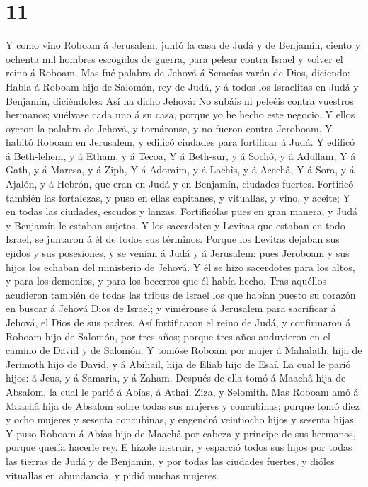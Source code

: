 \hypertarget{section-10}{%
\section{11}\label{section-10}}

 Y como vino Roboam á Jerusalem, juntó la casa de Judá y de
Benjamín, ciento y ochenta mil hombres escogidos de guerra, para pelear
contra Israel y volver el reino á Roboam.  Mas fué palabra
de Jehová á Semeías varón de Dios, diciendo:  Habla á Roboam
hijo de Salomón, rey de Judá, y á todos los Israelitas en Judá y
Benjamín, diciéndoles:  Así ha dicho Jehová: No subáis ni
peleéis contra vuestros hermanos; vuélvase cada uno á su casa, porque yo
he hecho este negocio. Y ellos oyeron la palabra de Jehová, y
tornáronse, y no fueron contra Jeroboam.  Y habitó Roboam en
Jerusalem, y edificó ciudades para fortificar á Judá.  Y
edificó á Beth-lehem, y á Etham, y á Tecoa,  Y á Beth-sur, y
á Sochô, y á Adullam,  Y á Gath, y á Maresa, y á Ziph,
 Y á Adoraim, y á Lachîs, y á Acechâ,  Y á
Sora, y á Ajalón, y á Hebrón, que eran en Judá y en Benjamín, ciudades
fuertes.  Fortificó también las fortalezas, y puso en ellas
capitanes, y vituallas, y vino, y aceite;  Y en todas las
ciudades, escudos y lanzas. Fortificólas pues en gran manera, y Judá y
Benjamín le estaban sujetos.  Y los sacerdotes y Levitas
que estaban en todo Israel, se juntaron á él de todos sus términos.
 Porque los Levitas dejaban sus ejidos y sus posesiones, y
se venían á Judá y á Jerusalem: pues Jeroboam y sus hijos los echaban
del ministerio de Jehová.  Y él se hizo sacerdotes para los
altos, y para los demonios, y para los becerros que él había hecho.
 Tras aquéllos acudieron también de todas las tribus de
Israel los que habían puesto su corazón en buscar á Jehová Dios de
Israel; y viniéronse á Jerusalem para sacrificar á Jehová, el Dios de
sus padres.  Así fortificaron el reino de Judá, y
confirmaron á Roboam hijo de Salomón, por tres años; porque tres años
anduvieron en el camino de David y de Salomón.  Y tomóse
Roboam por mujer á Mahalath, hija de Jerimoth hijo de David, y á
Abihail, hija de Eliab hijo de Esaí.  La cual le parió
hijos: á Jeus, y á Samaria, y á Zaham.  Después de ella
tomó á Maachâ hija de Absalom, la cual le parió á Abías, á Athai, Ziza,
y Selomith.  Mas Roboam amó á Maachâ hija de Absalom sobre
todas sus mujeres y concubinas; porque tomó diez y ocho mujeres y
sesenta concubinas, y engendró veintiocho hijos y sesenta hijas.
 Y puso Roboam á Abías hijo de Maachâ por cabeza y príncipe
de sus hermanos, porque quería hacerle rey.  E hízole
instruir, y esparció todos sus hijos por todas las tierras de Judá y de
Benjamín, y por todas las ciudades fuertes, y dióles vituallas en
abundancia, y pidió muchas mujeres.

